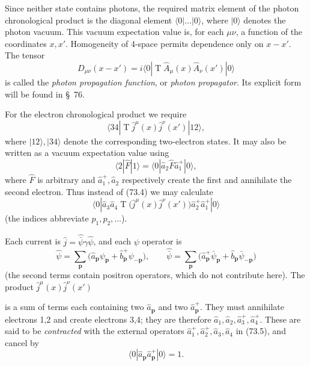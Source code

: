 Since neither state contains photons, the required matrix element of the photon chronological product is the diagonal element $\langle0|\ldots|0\rangle$, where $|0\rangle$ denotes the photon vacuum. This vacuum expectation value is, for each $\mu\nu$, a function of the coordinates $x,x'$. Homogeneity of 4-space permits dependence only on $x-x'$. The tensor
\begin{equation}
D_{\mu\nu}(x-x')=i\langle0|\mathop{\mathrm T}\hat A_\mu(x)\hat A_\nu(x')|0\rangle
\tag{73.3}
\end{equation}
is called the \emph{photon propagation function}, or \emph{photon propagator}. Its explicit form will be found in \S~76.

For the electron chronological product we require
\begin{equation}
\langle34|\mathop{\mathrm T}\hat j^\mu(x)\hat j^\nu(x')|12\rangle,
\tag{73.4}
\end{equation}
where $|12\rangle,|34\rangle$ denote the corresponding two-electron states. It may also be written as a vacuum expectation value using
\[
\langle2|\hat F|1\rangle=\langle0|\hat a_2\hat F\hat a_1^+|0\rangle,
\]
where $\hat F$ is arbitrary and $\hat a_1^+,\hat a_2$ respectively create the first and annihilate the second electron. Thus instead of (73.4) we may calculate
\begin{equation}
\langle0|\hat a_3\hat a_4\mathop{\mathrm T}\bigl(\hat j^\mu(x)\hat j^\nu(x')\bigr)\hat a_2^+\hat a_1^+|0\rangle
\tag{73.5}
\end{equation}
(the indices abbreviate $p_1,p_2,\ldots$).

Each current is $\hat j=\widehat{\bar\psi}\gamma\hat\psi$, and each $\psi$ operator is
\begin{equation}
\hat\psi=\sum_{\mathbf p}\bigl(\hat a_{\mathbf p}\psi_{\mathbf p}+\hat b_{\mathbf p}^+\psi_{-\mathbf p}\bigr),
\qquad
\widehat{\bar\psi}=\sum_{\mathbf p}\bigl(\hat a_{\mathbf p}^+\bar\psi_{\mathbf p}+\hat b_{\mathbf p}\bar\psi_{-\mathbf p}\bigr)
\tag{73.6}
\end{equation}
(the second terms contain positron operators, which do not contribute here). The product $\hat j^\mu(x)\hat j^\nu(x')$

is a sum of terms each containing two $\hat a_{\mathbf p}$ and two $\hat a_{\mathbf p}^+$. They must annihilate electrons 1,2 and create electrons 3,4; they are therefore $\hat a_1,\hat a_2,\hat a_3^+,\hat a_4^+$. These are said to be \emph{contracted} with the external operators $\hat a_1^+,\hat a_2^+,\hat a_3,\hat a_4$ in (73.5), and cancel by
\begin{equation}
\langle0|\hat a_{\mathbf p}\hat a_{\mathbf p}^+|0\rangle=1.
\tag{73.7}
\end{equation}

